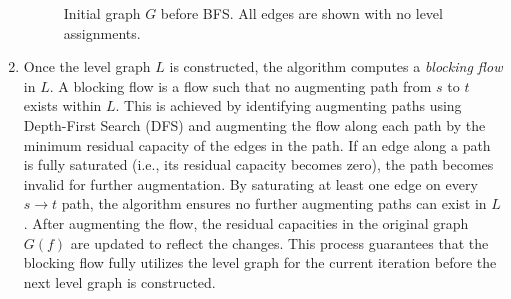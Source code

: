 \begin{enumerate}
\begin{figure}[ht]
\begin{tikzpicture}[scale=1.5]
        \end{tikzpicture}
        \label{fig:level_graph}
        \caption{Initial graph \( G \) before BFS. All edges are shown with no level assignments.}
        \end{figure}
        

    \item Once the level graph \(L\) is constructed, the algorithm computes a \textit{blocking flow} in \(L\). A blocking flow is a flow such that no augmenting path from \(s\) to \(t\) exists within \(L\). This is achieved by identifying augmenting paths using Depth-First Search (DFS) and augmenting the flow along each path by the minimum residual capacity of the edges in the path. If an edge along a path is fully saturated (i.e., its residual capacity becomes zero), the path becomes invalid for further augmentation. By saturating at least one edge on every \(s \to t\) path, the algorithm ensures no further augmenting paths can exist in \(L\). After augmenting the flow, the residual capacities in the original graph \(G(f)\) are updated to reflect the changes. This process guarantees that the blocking flow fully utilizes the level graph for the current iteration before the next level graph is constructed.

    \begin{figure}[h]
        \centering
\end{figure}
\end{enumerate}

